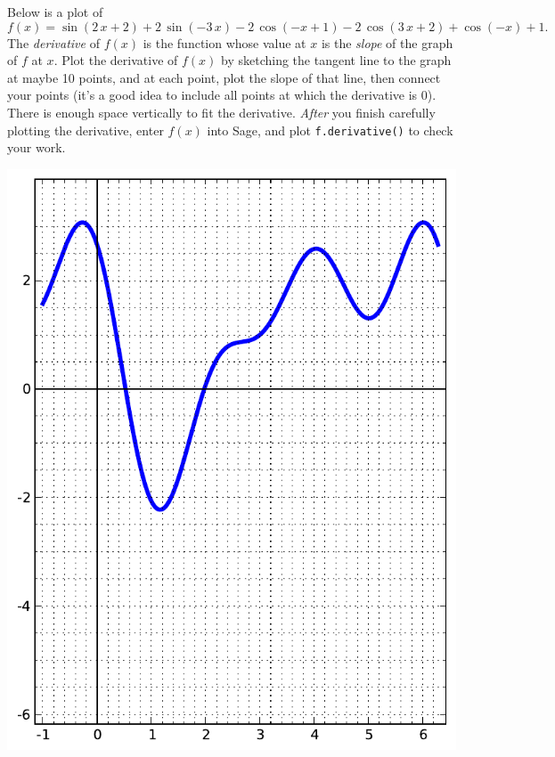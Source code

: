 Below is a plot of $$f(x)=\sin\left(2 \, x + 2\right) + 2 \, \sin\left(-3 \, x\right) - 2 \, \cos\left(-x + 1\right) - 2 \, \cos\left(3 \, x + 2\right) + \cos\left(-x\right) + 1.$$  The {\em \color{red}derivative} of $f(x)$ is the function whose value at $x$ is the {\em slope} of the graph of $f$ at $x$.  Plot the derivative of $f(x)$ by sketching the tangent line to the graph at maybe 10 points, and at each point, plot the slope of that line, then connect your points (it's a good idea to include all points at which the derivative is 0).  There is enough space vertically to fit the derivative.  {\em After} you finish carefully plotting the derivative, enter $f(x)$ into Sage, and plot {\color{blue}\verb|f.derivative()|} to check your work.
\begin{center}\includegraphics{functions/19.pdf}\end{center}\newpage


